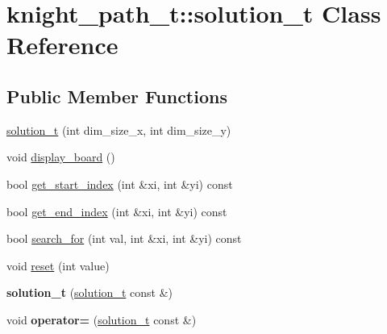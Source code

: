 \hypertarget{classknight__path__t_1_1solution__t}{\section{knight\-\_\-path\-\_\-t\-:\-:solution\-\_\-t \-Class \-Reference}
\label{classknight__path__t_1_1solution__t}
}
\subsection*{\-Public \-Member \-Functions}
\begin{DoxyCompactItemize}
\item 
\hyperlink{classknight__path__t_1_1solution__t_ab72a2b74c697bdc5bde229af6b67f7b6}{solution\-\_\-t} (int dim\-\_\-size\-\_\-x, int dim\-\_\-size\-\_\-y)
\item 
void \hyperlink{classknight__path__t_1_1solution__t_a89b4b26cefee7c77b36f4139d076d754}{display\-\_\-board} ()
\item 
bool \hyperlink{classknight__path__t_1_1solution__t_a74ab0034e648209c8c61a49d289eecb7}{get\-\_\-start\-\_\-index} (int \&xi, int \&yi) const 
\item 
bool \hyperlink{classknight__path__t_1_1solution__t_ab9dbb7f757fd2340fc1b80f1973fd331}{get\-\_\-end\-\_\-index} (int \&xi, int \&yi) const 
\item 
bool \hyperlink{classknight__path__t_1_1solution__t_ab00e34ab2528fb5f334a6fc18f85772c}{search\-\_\-for} (int val, int \&xi, int \&yi) const 
\item 
void \hyperlink{classknight__path__t_1_1solution__t_abfeb409f624c316effbb21667a8b09ba}{reset} (int value)
\item 
\hypertarget{classknight__path__t_1_1solution__t_ac3c6586ec666957408b355ce7ef25694}{{\bfseries solution\-\_\-t} (\hyperlink{classknight__path__t_1_1solution__t}{solution\-\_\-t} const \&)}\label{classknight__path__t_1_1solution__t_ac3c6586ec666957408b355ce7ef25694}

\item 
\hypertarget{classknight__path__t_1_1solution__t_ac5c5f067d13b1ea830e458ecd07a3036}{void {\bfseries operator=} (\hyperlink{classknight__path__t_1_1solution__t}{solution\-\_\-t} const \&)}\label{classknight__path__t_1_1solution__t_ac5c5f067d13b1ea830e458ecd07a3036}

\end{DoxyCompactItemize}
